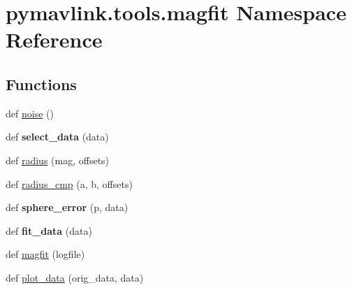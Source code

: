 \hypertarget{namespacepymavlink_1_1tools_1_1magfit}{}\section{pymavlink.\+tools.\+magfit Namespace Reference}
\label{namespacepymavlink_1_1tools_1_1magfit}
\subsection*{Functions}
\begin{DoxyCompactItemize}
\item 
def \hyperlink{namespacepymavlink_1_1tools_1_1magfit_a1ac824bd9533f61b3719628394a63f71}{noise} ()
\item 
\mbox{\label{namespacepymavlink_1_1tools_1_1magfit_ae5cfb18d0ec8a01c11dd00ef0a2d8a40}} 
def {\bfseries select\+\_\+data} (data)
\item 
def \hyperlink{namespacepymavlink_1_1tools_1_1magfit_a62287ea1457f17318d050e233a94c7d9}{radius} (mag, offsets)
\item 
def \hyperlink{namespacepymavlink_1_1tools_1_1magfit_aecea0b6954ec65248c3cd767cae448eb}{radius\+\_\+cmp} (a, b, offsets)
\item 
\mbox{\label{namespacepymavlink_1_1tools_1_1magfit_ae6c075abeaba6f6da5ea3023a1f136da}} 
def {\bfseries sphere\+\_\+error} (p, data)
\item 
\mbox{\label{namespacepymavlink_1_1tools_1_1magfit_a6319a159948ba8c06e42b01fc3ce3ffc}} 
def {\bfseries fit\+\_\+data} (data)
\item 
def \hyperlink{namespacepymavlink_1_1tools_1_1magfit_a91167174e4e89e986413000d1117081c}{magfit} (logfile)
\item 
def \hyperlink{namespacepymavlink_1_1tools_1_1magfit_a2689a4d34638be4aa45cf5592cc70b3f}{plot\+\_\+data} (orig\+\_\+data, data)
\end{DoxyCompactItemize}
